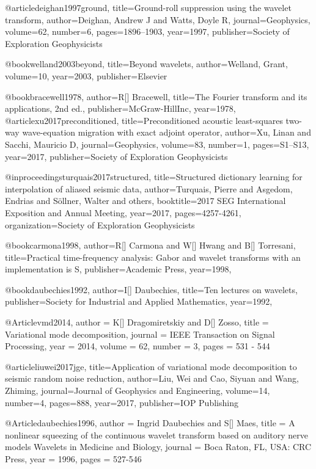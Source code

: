 @article{deighan1997ground,
  title={Ground-roll suppression using the wavelet transform},
  author={Deighan, Andrew J and Watts, Doyle R},
  journal={Geophysics},
  volume={62},
  number={6},
  pages={1896--1903},
  year={1997},
  publisher={Society of Exploration Geophysicists}
}

@book{welland2003beyond,
  title={Beyond wavelets},
  author={Welland, Grant},
  volume={10},
  year={2003},
  publisher={Elsevier}
}


@book{bracewell1978,
  author={R[] Bracewell},
  title={The {F}ourier transform and its applications, 2nd ed.},
  publisher={McGraw-HillInc},
  year=1978,
}
@article{xu2017preconditioned,
  title={Preconditioned acoustic least-squares two-way wave-equation migration with exact adjoint operator},
  author={Xu, Linan and Sacchi, Mauricio D},
  journal={Geophysics},
  volume={83},
  number={1},
  pages={S1--S13},
  year={2017},
  publisher={Society of Exploration Geophysicists}
}


@inproceedings{turquais2017structured,
  title={Structured dictionary learning for interpolation of aliased seismic data},
  author={Turquais, Pierre and Asgedom, Endrias and S{\"o}llner, Walter and others},
  booktitle={2017 SEG International Exposition and Annual Meeting},
  year={2017},
  pages={4257-4261},
  organization={Society of Exploration Geophysicists}
}

@book{carmona1998,
  author={R[] Carmona and W[] Hwang and B[] Torresani},
  title={Practical time-frequency analysis: Gabor and wavelet transforms with an implementation is S},
  publisher={Academic Press},
  year=1998,
}

@book{daubechies1992,
  author={I[] Daubechies},
  title={Ten lectures on wavelets},
  publisher={Society for Industrial and Applied Mathematics},
  year=1992,
}

@Article{vmd2014,
  author = 	 {K[] Dragomiretskiy and D[] Zosso},
  title = 	 {Variational mode decomposition},
  journal = 	 {IEEE Transaction on Signal Processing},
  year = 	 2014,
  volume = 62,
  number = 3,
  pages = 	 {531 - 544}
}


@article{liuwei2017jge,
  title={Application of variational mode decomposition to seismic random noise reduction},
  author={Liu, Wei and Cao, Siyuan and Wang, Zhiming},
  journal={Journal of Geophysics and Engineering},
  volume={14},
  number={4},
  pages={888},
  year={2017},
  publisher={IOP Publishing}
}

@Article{daubechies1996,
  author = 	 {Ingrid Daubechies and S[] Maes},
  title = 	 {A nonlinear squeezing of the continuous wavelet transform based on auditory nerve models Wavelets in Medicine and Biology},
  journal = 	 {Boca Raton, FL, USA: CRC Press},
  year = 	 1996,
  pages = 	 {527-546}
}

